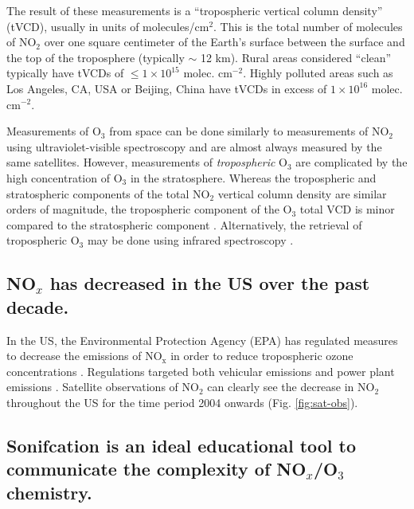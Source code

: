 \documentclass[a4paper,10pt,oneside]{article}
\newcommand{\ce}[1]{$\mathrm{#1}$}
\begin{document}
\begin{sloppy}
The result of these measurements is a ``tropospheric vertical column density'' (tVCD), usually in units of molecules/cm$^2$. This is the total number of molecules of \ce{NO_2} over one square centimeter of the Earth's surface between the surface and the top of the troposphere (typically $\sim$ 12 km). Rural areas considered ``clean'' typically have tVCDs of $\leq 1 \times 10^{15}$ molec. cm$^{-2}$. Highly polluted areas such as Los Angeles, CA, USA or Beijing, China have tVCDs in excess of $1 \times 10^{16}$ molec. cm$^{-2}$.

Measurements of \ce{O_3} from space can be done similarly to measurements of \ce{NO_2} using ultraviolet-visible spectroscopy and are almost always measured by the same satellites. However, measurements of \emph{tropospheric} \ce{O_3} are complicated by the high concentration of \ce{O_3} in the stratosphere. Whereas the tropospheric and stratospheric components of the total \ce{NO_2} vertical column density are similar orders of magnitude, the tropospheric component of the \ce{O_3} total VCD is minor compared to the stratospheric component \cite{monks-beirle}. Alternatively, the retrieval of tropospheric \ce{O_3} may be done using infrared spectroscopy \cite{nassar08}.

\subsection{NO$_x$ has decreased in the US over the past decade.}
\label{sec:nox-decrease}

In the US, the Environmental Protection Agency (EPA) has regulated measures to decrease the emissions of \ce{NO_x} in order to reduce tropospheric ozone concentrations \cite{epa99}. Regulations targeted both vehicular emissions \cite{epa16} and power plant emissions \cite{epa-cair}.  Satellite observations of \ce{NO_2} \cite{russell12, kim09, lu15} can clearly see the decrease in \ce{NO_2} throughout the US for the time period 2004 onwards (Fig. \ref{fig:sat-obs}).

\subsection{Sonifcation is an ideal educational tool to communicate the complexity of NO$_x$/O$_3$ chemistry.}


\end{sloppy}
\end{document}
